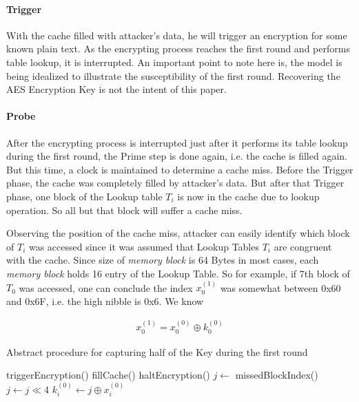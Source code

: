 \paragraph{Trigger}
With the cache filled with attacker's data, he will trigger an encryption for some known plain text. As the encrypting process reaches the first round and performs table lookup, it is interrupted. An important point to note here is, the model is being idealized to illustrate the susceptibility of the first round. Recovering the AES Encryption Key is not the intent of this paper.

\paragraph{Probe}
After the encrypting process is interrupted just after it performs its table lookup during the first round, the Prime step is done again, i.e. the cache is filled again. But this time, a clock is maintained to determine a cache miss. Before the Trigger phase, the cache was completely filled by attacker's data. But after that Trigger phase, one block of the 
Lookup table $T_i$ is now in the cache due to lookup operation. So all but that block will suffer a cache miss.

Observing the position of the cache miss, attacker can easily identify which block of $T_i$ was accessed since it was assumed that Lookup Tables $T_i$ are congruent with the cache. Since size of \emph{memory block} is 64 Bytes in most cases, each \emph{memory block} holds 16 entry of the Lookup Table. So for example, if 7th block of $T_0$ was accessed, one can conclude the index $x_0^{(1)}$ was somewhat between 0x60 and 0x6F, i.e. the high nibble is 0x6. We know

\begin{align*}
x_0^{(1)}=x_0^{(0)} \oplus k_0^{(0)}
\end{align*}

\begin{algorithm}
\caption{Abstract procedure for capturing half of the Key during the first round}
\label{Abstract procedure for capturing half of the Key during the First Round}
\begin{algorithmic}[1]
	\State triggerEncryption()
		\State fillCache()
		\State haltEncryption()
		\State $j \gets$ missedBlockIndex()
		\State $j \gets j\ll 4$
		\State $k_i^{(0)} \gets j \oplus x_i^{(0)}$
	\EndFor
\end{algorithmic}
\end{algorithm}


